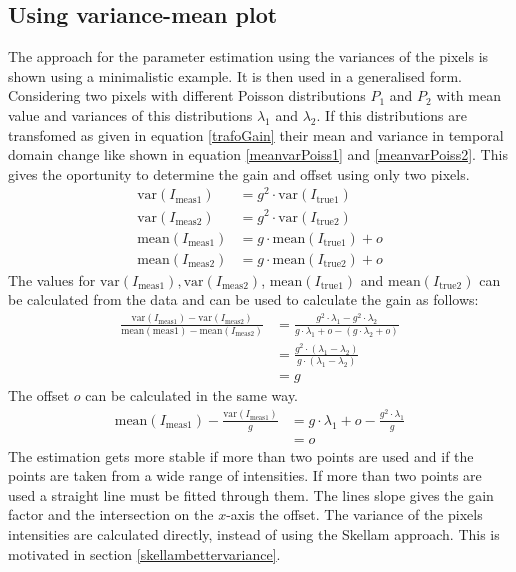 \subsection{Using variance-mean plot} \label{skellam1}
The approach for the parameter estimation using the variances of the pixels is shown using a minimalistic example. It is then used in a generalised form.\newline
Considering two pixels with different Poisson distributions $P_1$ and $P_2$ with mean value and variances of this distributions $\lambda_1$ and $\lambda_2$. If this distributions are transfomed as given in equation \ref{trafoGain} their mean and variance in temporal domain change like shown in equation \ref{meanvarPoiss1} and \ref{meanvarPoiss2}. This gives the oportunity to determine the gain and offset using only two pixels.
\begin{align}
	\text{var}(I_{\text{meas}1})& = g^2\cdot\text{var}(I_{\text{true}1}) \label{calcvar}\\ 
	\text{var}(I_{\text{meas}2})& = g^2\cdot\text{var}(I_{\text{true}2})\\
	\text{mean}(I_{\text{meas}1})& = g\cdot \text{mean}(I_{\text{true}1}) + o\\
	\text{mean}(I_{\text{meas}2})& = g\cdot \text{mean}(I_{\text{true}2}) + o
\end{align}
The values for $\text{var}(I_{\text{meas}1}), \text{var}(I_{\text{meas}2})$, $\text{mean}(I_{\text{true}1})$ and $\text{mean}(I_{\text{true}2})$ can be calculated from the data and can be used to calculate the gain as follows:
\begin{align}
	\frac{\text{var}(I_{\text{meas}1})-\text{var}(I_{\text{meas}2})}{\text{mean}({\text{meas}1})-\text{mean}(I_{\text{meas}2})}&= \frac{g^2\cdot \lambda_1  - g^2\cdot \lambda_2 }{g\cdot \lambda_1 + o - (g\cdot \lambda_2+o)}\\
	& = \frac{g^2\cdot(\lambda_1-\lambda_2)}{g\cdot (\lambda_1-\lambda_2)}\\
	& = g
\end{align}
The offset $o$ can be calculated in the same way.
\begin{align}
	\text{mean}(I_{\text{meas}1}) - \frac{\text{var}(I_{\text{meas}1})}{g} &= g\cdot \lambda_1 + o - \frac{g^2\cdot\lambda_1}{g}\\
	&= o
\end{align}
The estimation gets more stable if more than two points are used and if the points are taken from a wide range of intensities. If more than two points are used a straight line must be fitted through them. The lines slope gives the gain factor and the intersection on the $x$-axis the offset. The variance of the pixels intensities are calculated directly, instead of using the Skellam approach. This is motivated in section \ref{skellambettervariance}.
